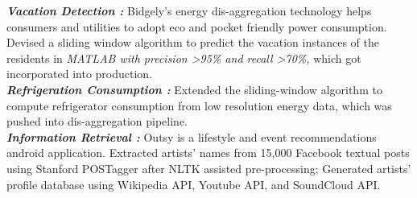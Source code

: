 \documentclass[11pt,a4paper,sans]{moderncv}        %
\begin{document}
\vspace{-2mm}
{\textbf{\textit{Vacation Detection : }}Bidgely's energy dis-aggregation technology helps consumers and utilities to adopt eco and pocket friendly power consumption. Devised a sliding window algorithm to predict the vacation instances of the residents in \textit{MATLAB with precision \textgreater95\% and recall \textgreater70\%,} which got incorporated into production.
\vspace{2} \\ 
\textbf{\textit{Refrigeration Consumption : }}Extended the sliding-window algorithm to compute refrigerator consumption from low resolution energy data, which was pushed into dis-aggregation pipeline. \\}
\vspace{-2mm}
{\textbf{\textit{Information Retrieval : }}Outsy is a lifestyle and event recommendations android application. Extracted artists' names from 15,000 Facebook textual posts using Stanford POSTagger after NLTK assisted pre-processing; Generated artists' profile database using Wikipedia API, Youtube API, and SoundCloud API.}
\vspace{-1} \\ 
\end{document}

